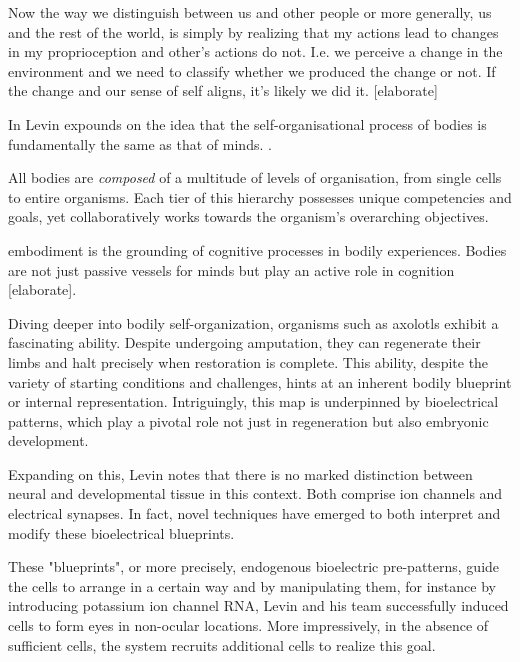 Now the way we distinguish between us and other people or more generally, us and the rest of the world, is simply by realizing that my actions lead to changes in my proprioception and other's actions do not. I.e. we perceive a change in the environment and we need to classify whether we produced the change or not. If the change and our sense of self aligns, it's likely we did it.  [elaborate]

In  Levin expounds on the idea that the self-organisational process of bodies is fundamentally the same as that of minds.
. 

All bodies are \emph{composed} of a multitude of levels of organisation, from single cells to entire organisms. Each tier of this hierarchy possesses unique competencies and goals, yet collaboratively works towards the organism's overarching objectives.

\Gls{embodiment} is the grounding of cognitive processes in bodily experiences. Bodies are not just passive vessels for minds but play an active role in cognition  [elaborate]. 

Diving deeper into bodily self-organization, organisms such as axolotls exhibit a fascinating ability. Despite undergoing amputation, they can regenerate their limbs and halt precisely when restoration is complete. This ability, despite the variety of starting conditions and challenges, hints at an inherent bodily blueprint or internal representation. Intriguingly, this map is underpinned by bioelectrical patterns, which play a pivotal role not just in regeneration but also embryonic development.

Expanding on this, Levin notes that there is no marked distinction between neural and developmental tissue in this context. Both comprise ion channels and electrical synapses. In fact, novel techniques have emerged to both interpret and modify these bioelectrical blueprints. 

These "blueprints", or more precisely, endogenous bioelectric pre-patterns, guide the cells to arrange in a certain way and by manipulating them, for instance by introducing potassium ion channel RNA, Levin and his team successfully induced cells to form eyes in non-ocular locations. More impressively, in the absence of sufficient cells, the system recruits additional cells to realize this goal.

